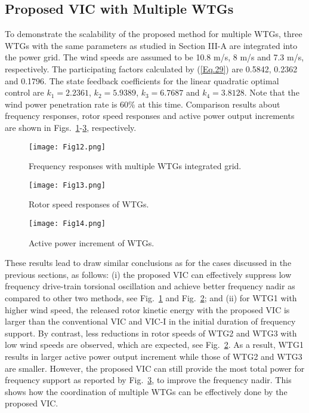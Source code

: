 \documentclass[journal]{IEEEtran}
\begin{document}
\subsection{Proposed VIC with Multiple WTGs}

To demonstrate the scalability of the proposed method for multiple WTGs, three WTGs with the same parameters as studied in Section III-A are integrated into the power grid. The wind speeds are assumed to be 10.8 m/s, 8 m/s and 7.3 m/s, respectively. The participating factors calculated by (\ref{Eq.29}) are 0.5842, 0.2362 and 0.1796. The state feedback coefficients for the linear quadratic optimal control are $k_1=2.2361$, $k_2=5.9389$, $k_3=6.7687$ and $k_4=3.8128$. Note that the wind power penetration rate is 60\% at this time. Comparison results about frequency responses, rotor speed responses and active power output increments are shown in Figs.~\ref{Fig.12}-\ref{Fig.14}, respectively.

\begin{figure}
  \centering
  \texttt{[image: Fig12.png]}
  \caption{Frequency responses with multiple WTGs integrated grid.}
  \label{Fig.12}
\end{figure}
\begin{figure}
  \centering
  \texttt{[image: Fig13.png]}
  \caption{Rotor speed responses of WTGs.}
  \label{Fig.13}
\end{figure}
\begin{figure}
  \centering
  \texttt{[image: Fig14.png]}
  \caption{Active power increment of WTGs.}
  \label{Fig.14}
\end{figure}

These results lead to draw similar conclusions as for the cases discussed in the previous sections, as follows:  (i) the proposed VIC can effectively suppress low frequency drive-train torsional oscillation and achieve better frequency nadir as compared to other two methods, see Fig.~\ref{Fig.12} and Fig.~\ref{Fig.13}; and (ii) for WTG1 with higher wind speed, the released rotor kinetic energy with the proposed VIC is larger than the conventional VIC and VIC-I in the initial duration of frequency support. By contrast, less reductions in rotor speeds of WTG2 and WTG3 with low wind speeds are observed, which are expected, see Fig.~\ref{Fig.13}.  As a result, WTG1 results in larger active power output increment while those of WTG2 and WTG3 are smaller. However, the proposed VIC can still provide the most total power for frequency support as reported by Fig.~\ref{Fig.14}, to improve the frequency nadir. This shows how the coordination of multiple WTGs can be effectively done by the proposed VIC.
\end{document}
